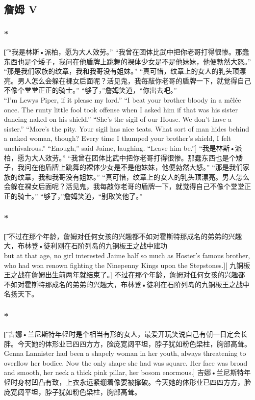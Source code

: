 \documentclass[12pt,a4paper]{article}
\begin{document}
\subsection{詹姆 V}
\subsubsection{\color{red}*}\t[
	 “我是林斯•派柏，愿为大人效劳。” “我曾在团体比武中把你老哥打得很惨。那蠢东西也是个矮子，我问在他盾牌上跳舞的裸体少女是不是他妹妹，他便勃然大怒。” “那是我们家族的纹章，我和我哥没有姐妹。” “真可惜，纹章上的女人的乳头顶漂亮。男人怎么会躲在裸女后面呢？活见鬼，我每敲你老哥的盾牌一下，就觉得自己不像个堂堂正正的骑士。” “够了，”詹姆笑道，“你出去吧。”\\
	 “I'm Lewys Piper, if it please my lord.”  “I beat your brother bloody in a mêlée once. The runty little fool took offense when I asked him if that was his sister dancing naked on his shield.”  “She's the sigil of our House. We don't have a sister.”  “More's the pity. Your sigil has nice teats. What sort of man hides behind a naked woman, though? Every time I thumped your brother's shield, I felt unchivalrous.”  “Enough,” said Jaime, laughing. “Leave him be.”]
	 “我是林斯•派柏，愿为大人效劳。” “我曾在团体比武中把你老哥打得很惨。那蠢东西也是个矮子，我问在他盾牌上跳舞的裸体少女是不是他妹妹，他便勃然大怒。” “那是我们家族的纹章，我和我哥没有姐妹。” “真可惜，纹章上的女人的乳头顶漂亮。男人怎么会躲在裸女后面呢？活见鬼，我每敲你老哥的盾牌一下，就觉得自己不像个堂堂正正的骑士。” “够了，”詹姆笑道，“别取笑他了。”

\subsubsection{\color{red}*}\t[
	不过在那个年龄，詹姆对任何女孩的兴趣都不如对霍斯特那成名的弟弟的兴趣大，布林登•徒利刚在石阶列岛的九铜板王之战中建功\\
	but at that age, no girl interested Jaime half so much as Hoster's famous brother, who had won renown fighting the Ninepenny Kings upon the Stepstones.][
	九铜板王之战在詹姆出生前两年就结束了。]
	不过在那个年龄，詹姆对任何女孩的兴趣都不如对霍斯特那成名的弟弟的兴趣大，布林登•徒利在石阶列岛的九铜板王之战中名扬天下。
	
\subsubsection{\color{red}*}\t[
	吉娜•兰尼斯特年轻时是个相当有形的女人，最爱开玩笑说自己有朝一日定会长胖。今天她的体形业已四四方方，脸庞宽阔平坦，脖子犹如粉色梁柱，胸部高耸。\\
	Genna Lannister had been a shapely woman in her youth, always threatening to overflow her bodice. Now the only shape she had was square. Her face was broad and smooth, her neck a thick pink pillar, her bosom enormous.]
	吉娜•兰尼斯特年轻时身材凹凸有致，上衣永远紧绷着像要被撑破。今天她的体形业已四四方方，脸庞宽阔平坦，脖子犹如粉色梁柱，胸部高耸。
	
\end{document}
